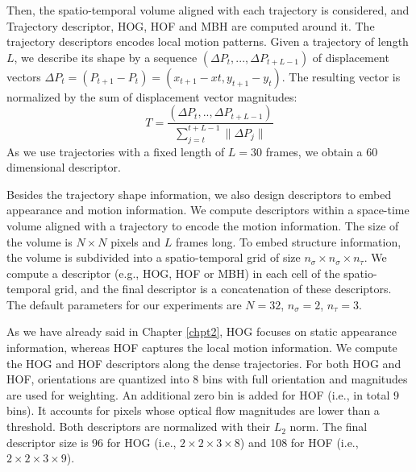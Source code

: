 Then, the spatio-temporal volume aligned with each trajectory is considered, and Trajectory descriptor, HOG, HOF and MBH are computed around it. The trajectory descriptors encodes local motion patterns. Given a trajectory of length $L$, we describe its
shape by a sequence $(\Delta P_t, ..., \Delta P_{t+L-1})$ of displacement vectors $\Delta P_t = (P_{t+1}- P_t) = (x_{t+1} -
xt, y_{t+1}- y_t)$. The resulting vector is normalized by the sum of displacement vector magnitudes:
\begin{equation}
T = \frac{(\Delta P_t, .., \Delta P_{t+L-1})}{\sum_{j=t}^{t+L-1} \| \Delta P_j \|}
\end{equation}
As we use trajectories with a fixed length of $L = 30$ frames, we obtain a 60 dimensional descriptor.

Besides the trajectory shape information, we also design descriptors to embed appearance and motion
information. We compute
descriptors within a space-time volume aligned with a trajectory to encode the motion information. The size of the volume is $N \times N$ pixels and $L$ frames long. To embed structure information, the volume is subdivided into a spatio-temporal grid of size $n_\sigma \times n_\sigma \times n_\tau$. We compute a descriptor (e.g.,
HOG, HOF or MBH) in each cell of the spatio-temporal grid, and the final descriptor is a concatenation
of these descriptors. The default parameters for our experiments are $N = 32$, $n_\sigma = 2$, $n_\tau = 3$.

As we have already said in Chapter \ref{chpt2}, HOG focuses on static appearance information, whereas HOF captures the
local motion information. We compute the HOG and HOF descriptors along the dense trajectories. For both HOG and HOF,
orientations are quantized into 8 bins with full orientation and magnitudes are used for weighting. An
additional zero bin is added for HOF (i.e., in total 9 bins). It accounts for pixels whose optical flow
magnitudes are lower than a threshold. Both descriptors are normalized with their $L_2$ norm. The final
descriptor size is 96 for HOG (i.e., $2\times 2\times 3\times 8$) and 108 for HOF (i.e., $2\times 2 \times 3 \times 9$).

